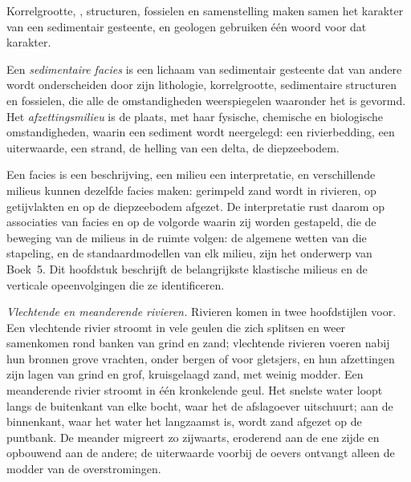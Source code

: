 Korrelgrootte, , structuren, fossielen en samenstelling maken samen het karakter van een sedimentair gesteente, en geologen gebruiken één woord voor dat karakter.

\begin{definition}\label{def:b1:clastic-sediments:facies}
Een \emph{sedimentaire facies} is een lichaam van sedimentair gesteente dat van andere wordt onderscheiden door zijn lithologie, korrelgrootte, sedimentaire structuren en fossielen, die alle de omstandigheden weerspiegelen waaronder het is gevormd. Het \emph{afzettingsmilieu} is de plaats, met haar fysische, chemische en biologische omstandigheden, waarin een sediment wordt neergelegd: een rivierbedding, een uiterwaarde, een strand, de helling van een delta, de diepzeebodem.
\end{definition}

Een facies is een beschrijving, een milieu een interpretatie, en verschillende milieus kunnen dezelfde facies maken: gerimpeld zand wordt in rivieren, op getijvlakten en op de diepzeebodem afgezet. De interpretatie rust daarom op associaties van facies en op de volgorde waarin zij worden gestapeld, die de beweging van de milieus in de ruimte volgen: de algemene wetten van die stapeling, en de standaardmodellen van elk milieu, zijn het onderwerp van Boek~5. Dit hoofdstuk beschrijft de belangrijkste klastische milieus en de verticale opeenvolgingen die ze identificeren.

\emph{Vlechtende en meanderende rivieren.} Rivieren komen in twee hoofdstijlen voor. Een vlechtende rivier stroomt in vele geulen die zich splitsen en weer samenkomen rond banken van grind en zand; vlechtende rivieren voeren nabij hun bronnen grove vrachten, onder bergen of voor gletsjers, en hun afzettingen zijn lagen van grind en grof, kruisgelaagd zand, met weinig modder. Een meanderende rivier stroomt in één kronkelende geul. Het snelste water loopt langs de buitenkant van elke bocht, waar het de afslagoever uitschuurt; aan de binnenkant, waar het water het langzaamst is, wordt zand afgezet op de puntbank. De meander migreert zo zijwaarts, eroderend aan de ene zijde en opbouwend aan de andere; de uiterwaarde voorbij de oevers ontvangt alleen de modder van de overstromingen.


